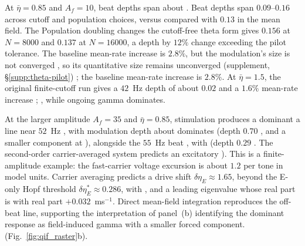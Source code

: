 \documentclass[11pt,a4paper]{article}
\providecommand{\DIFaddtex}[1]{{\protect\color{blue} \sf #1}} %
\providecommand{\DIFdeltex}[1]{{\protect\color{red} \scriptsize #1}} %
\providecommand{\DIFaddbegin}{} %
\providecommand{\DIFaddend}{} %
\providecommand{\DIFdelbegin}{} %
\providecommand{\DIFdelend}{} %
\providecommand{\DIFadd}[1]{\texorpdfstring{\DIFaddtex{#1}}{#1}} %
\providecommand{\DIFdel}[1]{\texorpdfstring{\DIFdeltex{#1}}{}} %
\begin{document}
\DIFdel{At $\bar\eta=0.85$ and $A_f=10$, beat depths span about }\DIFdelend \DIFaddbegin \DIFadd{.
Beat depths span }\DIFaddend $0.09$--$0.16$ across cutoff and population choices,
\DIFdelbegin \DIFdel{versus }\DIFdelend \DIFaddbegin \DIFadd{compared with }\DIFaddend $0.13$ in the mean field. \DIFdelbegin \DIFdel{The }\DIFdelend \DIFaddbegin \DIFadd{Population doubling changes the
}\DIFaddend cutoff-free \DIFdelbegin \DIFdel{theta form gives $0.156$ at $N=8000$ and $0.137$ at
$N=16000$, a }\DIFdelend \DIFaddbegin \DIFadd{depth by }\DIFaddend $12\%$\DIFdelbegin \DIFdel{change exceeding the pilot tolerance. The baseline
mean-rate increase is $2.8\%$, but the modulation's size is not converged
}\DIFdelend \DIFaddbegin \DIFadd{, so its quantitative size remains unconverged
}\DIFaddend (supplement, \S\ref{supp:theta-pilot})\DIFaddbegin \DIFadd{; the baseline mean-rate increase is
$2.8\%$}\DIFaddend . At $\bar\eta=1.5$, the original finite-cutoff run gives a
$42$~Hz depth of about $0.02$ and a $1.6\%$ mean-rate increase\DIFdelbegin \DIFdel{; }\DIFdelend \DIFaddbegin \DIFadd{, while
}\DIFaddend ongoing gamma dominates.

At \DIFdelbegin \DIFdel{the larger amplitude }\DIFdelend $A_f=35$ and $\bar\eta=0.85$, \DIFdelbegin \DIFdel{stimulation produces
a dominant }\DIFdelend \DIFaddbegin \DIFadd{a }\DIFaddend line near $52$~Hz \DIFdelbegin \DIFdel{, with modulation depth about }\DIFdelend \DIFaddbegin \DIFadd{dominates
(depth }\DIFaddend $0.70$\DIFdelbegin \DIFdel{, and a smaller component
at }\DIFdelend \DIFaddbegin \DIFadd{), alongside }\DIFaddend the $55$~Hz beat \DIFdelbegin \DIFdel{, with }\DIFdelend \DIFaddbegin \DIFadd{(}\DIFaddend depth $0.29$\DIFdelbegin \DIFdel{. The second-order carrier-averaged system
predicts an excitatory }\DIFdelend \DIFaddbegin \DIFadd{). This is a
finite-amplitude example: the fast-carrier voltage excursion is about
$1.2$ per tone in model units. Carrier averaging predicts a }\DIFaddend drive shift
$\delta\eta_E\approx1.65$, beyond the E-only Hopf threshold\DIFdelbegin \DIFdel{$\delta\eta_E^*\approx0.286$, with }\DIFdelend \DIFaddbegin \DIFadd{, and }\DIFaddend a
leading eigenvalue \DIFdelbegin \DIFdel{whose real part is }\DIFdelend \DIFaddbegin \DIFadd{with real part }\DIFaddend $+0.032$~ms$^{-1}$. Direct mean-field
integration reproduces the off-beat line, \DIFdelbegin \DIFdel{supporting the interpretation of panel~(b) }\DIFdelend \DIFaddbegin \DIFadd{identifying the dominant
response }\DIFaddend as field-induced gamma \DIFdelbegin \DIFdel{with a
smaller forced component.}\DIFdelend \DIFaddbegin \DIFadd{(Fig.~\ref{fig:qif_raster}b).
}\DIFaddend
\end{document}
